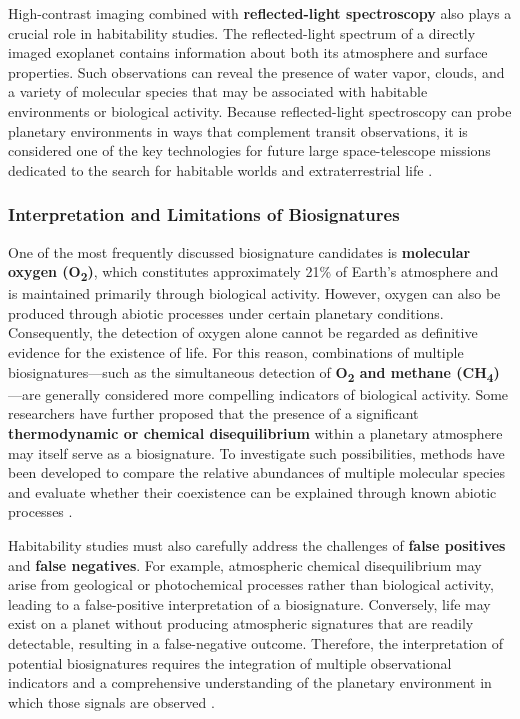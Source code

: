 High-contrast imaging combined with \textbf{reflected-light spectroscopy} also plays a crucial role in habitability studies. The reflected-light spectrum of a directly imaged exoplanet contains information about both its atmosphere and surface properties. Such observations can reveal the presence of water vapor, clouds, and a variety of molecular species that may be associated with habitable environments or biological activity. Because reflected-light spectroscopy can probe planetary environments in ways that complement transit observations, it is considered one of the key technologies for future large space-telescope missions dedicated to the search for habitable worlds and extraterrestrial life \cite{damiano2023}.

\subsubsection{Interpretation and Limitations of Biosignatures}

One of the most frequently discussed biosignature candidates is \textbf{molecular oxygen (O\textsubscript{2})}, which constitutes approximately 21\% of Earth's atmosphere and is maintained primarily through biological activity. However, oxygen can also be produced through abiotic processes under certain planetary conditions. Consequently, the detection of oxygen alone cannot be regarded as definitive evidence for the existence of life. For this reason, combinations of multiple biosignatures---such as the simultaneous detection of \textbf{O\textsubscript{2} and methane (CH\textsubscript{4})}---are generally considered more compelling indicators of biological activity. Some researchers have further proposed that the presence of a significant \textbf{thermodynamic or chemical disequilibrium} within a planetary atmosphere may itself serve as a biosignature. To investigate such possibilities, methods have been developed to compare the relative abundances of multiple molecular species and evaluate whether their coexistence can be explained through known abiotic processes \cite{claudi2019}.

Habitability studies must also carefully address the challenges of \textbf{false positives} and \textbf{false negatives}. For example, atmospheric chemical disequilibrium may arise from geological or photochemical processes rather than biological activity, leading to a false-positive interpretation of a biosignature. Conversely, life may exist on a planet without producing atmospheric signatures that are readily detectable, resulting in a false-negative outcome. Therefore, the interpretation of potential biosignatures requires the integration of multiple observational indicators and a comprehensive understanding of the planetary environment in which those signals are observed \cite{schwieterman2018}.

